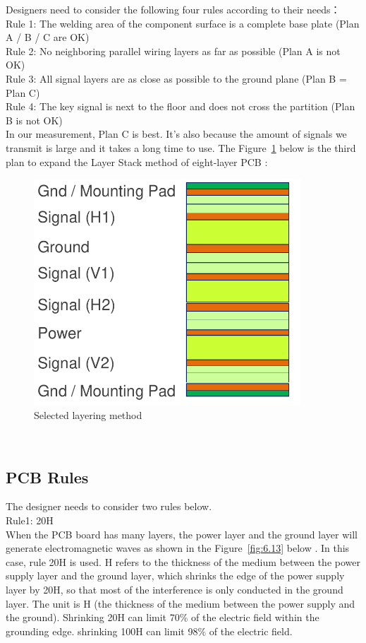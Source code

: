 Designers need to consider the following four rules according to their needs：
\\
Rule 1: The welding area of the component surface is a complete base plate (Plan A / B / C are OK)
\\
Rule 2: No neighboring parallel wiring layers as far as possible (Plan A is not OK)
\\
Rule 3: All signal layers are as close as possible to the ground plane (Plan B = Plan C)
\\
Rule 4: The key signal is next to the floor and does not cross the partition (Plan B is not OK)
\\
In our measurement, Plan C is best. It’s also because the amount of signals we transmit is large and it takes a long time to use.
The Figure~\ref{fig:6.11} below is the third plan to expand the Layer Stack method of eight-layer PCB \cite{lagenaufbau2021}:

\begin{figure}[!ht]
	\centering
	\includegraphics[width=10cm]{grafiken/6.11.pdf}
	\caption{Selected layering method} 
	\label{fig:6.11}
\end{figure}
\FloatBarrier
\\

\subsection{PCB Rules}
\label{sec:PCB Rules}
The designer needs to consider two rules below. 
\\
Rule1: 20H
\\
When the PCB board has many layers, the power layer and the ground layer will generate electromagnetic waves as shown in the Figure~\ref{fig:6.13} below \cite{gisin2001radiation}. In this case, rule 20H is used. H refers to the thickness of the medium between the power supply layer and the ground layer, which shrinks the edge of the power supply layer by 20H, so that most of the interference is only conducted in the ground layer. The unit is H (the thickness of the medium between the power supply and the ground). Shrinking 20H can limit 70$\%$ of the electric field within the grounding edge. shrinking 100H can limit 98$\%$ of the electric field.
 
